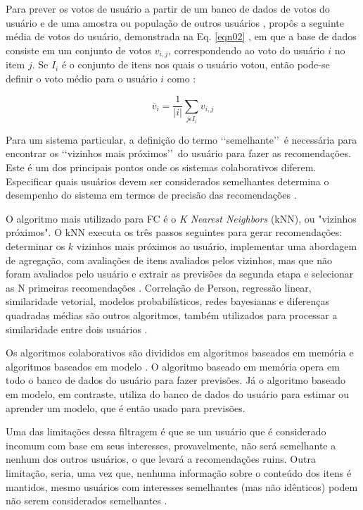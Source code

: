Para prever os votos de usuário a partir de um banco de dados de votos do usuário e de uma amostra ou população de outros usuários
,  propôs a seguinte média de votos do usuário, demonstrada na  Eq. \ref{eqn02} , em que a base de dados 
consiste em um conjunto de votos $v_{i,j}$, correspondendo ao voto do usuário $i$ no item $j$. Se $I_{i}$ é o
conjunto de itens nos quais o usuário votou, então pode-se definir o voto médio para o usuário $i$ como :

\begin{equation}
	\label{eqn02}
\overline{v}_{i} = \frac{1}{\left | i \right |} \sum_{j\epsilon I_{i}}^{} v_{i,j}
\end{equation}


Para um sistema particular, a definição do termo \lq\lq semelhante\rq\rq\ é necessária para encontrar 
os \lq\lq vizinhos mais próximos\rq\rq\ do usuário para fazer as recomendações. Este é um dos principais 
pontos onde os sistemas colaborativos diferem. Especificar quais usuários devem ser considerados semelhantes determina o
desempenho do sistema em termos de precisão das recomendações \cite{son2017}.

O algoritmo mais utilizado para FC é o \emph{K Nearest Neighbors} (kNN), ou "vizinhos próximos". O kNN executa 
os três passos seguintes para gerar recomendações: determinar os $k$ vizinhos mais próximos ao usuário, implementar 
uma abordagem de agregação, com avaliações de itens avaliados pelos vizinhos, mas que não foram avaliados pelo usuário e 
extrair as previsões da segunda etapa e selecionar as N primeiras recomendações \cite{bobadilla2013}. Correlação de Person, regressão linear, 
similaridade vetorial, modelos probabilísticos, redes bayesianas e diferenças quadradas médias são outros algoritmos, também utilizados para processar a similaridade entre dois usuários \cite{paulson2003}.

Os algoritmos colaborativos são divididos em algoritmos baseados em memória e algoritmos baseados em 
modelo \cite{breese2013}. O algoritmo baseado em memória opera em todo o banco de dados do usuário para fazer 
previsões. Já o algoritmo baseado em modelo, em contraste, utiliza do banco de dados do usuário 
para estimar ou aprender um modelo, que é então usado para previsões.

Uma das limitações dessa filtragem é que se um usuário que é considerado incomum com base em seus 
interesses, provavelmente, não será semelhante a nenhum dos outros usuários,
o que levará a recomendações ruins. Outra limitação, seria, uma vez que, nenhuma informação sobre o 
conteúdo dos itens é mantidos, mesmo usuários com interesses semelhantes (mas não 
idênticos) podem não serem considerados semelhantes \cite{son2017}.

